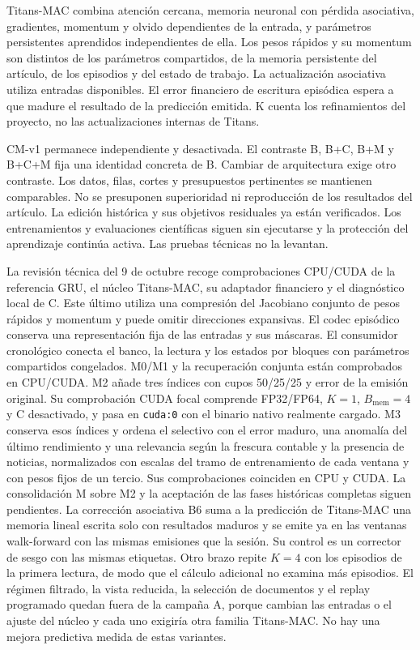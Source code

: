 \documentclass[11pt,a4paper]{report}
\begin{document}
Titans-MAC combina atención cercana, memoria neuronal con pérdida asociativa,
gradientes, momentum y olvido dependientes de la entrada, y parámetros
persistentes aprendidos independientes de ella. Los pesos rápidos y su momentum
son distintos de los parámetros compartidos, de la memoria persistente del
artículo, de los episodios y del estado de trabajo. La actualización asociativa
utiliza entradas disponibles. El error financiero de escritura episódica espera
a que madure el resultado de la predicción emitida. K cuenta los refinamientos
del proyecto, no las actualizaciones internas de Titans.

CM-v1 permanece independiente y desactivada. El contraste B, B+C, B+M y B+C+M
fija una identidad concreta de B. Cambiar de arquitectura exige otro contraste.
Los datos, filas, cortes y presupuestos pertinentes se mantienen comparables.
No se presuponen superioridad ni reproducción de los resultados del artículo.
La edición histórica y sus objetivos residuales ya están verificados. Los
entrenamientos y evaluaciones científicas siguen sin ejecutarse y la protección
del aprendizaje continúa activa. Las pruebas técnicas no la levantan.

La revisión técnica del 9 de octubre recoge comprobaciones CPU/CUDA de la referencia GRU,
el núcleo Titans-MAC, su adaptador financiero y el diagnóstico local de C.
Este último utiliza una compresión del Jacobiano conjunto de pesos rápidos
y momentum y puede omitir direcciones expansivas. El codec episódico conserva
una representación fija de las entradas y sus máscaras. El consumidor
cronológico conecta el banco, la lectura y los estados por bloques con
parámetros compartidos congelados. M0/M1 y la recuperación conjunta están
comprobados en CPU/CUDA. M2 añade tres índices con cupos 50/25/25 y error de la
emisión original. Su comprobación CUDA focal comprende FP32/FP64, $K=1$,
$B_{\mathrm{mem}}=4$ y C desactivado, y pasa en \texttt{cuda:0} con el binario
nativo realmente cargado. M3 conserva esos índices y ordena el selectivo con
el error maduro, una anomalía del último rendimiento y una relevancia según la
frescura contable y la presencia de noticias, normalizados con escalas del
tramo de entrenamiento de cada ventana y con pesos fijos de un tercio. Sus
comprobaciones coinciden en CPU y CUDA. La consolidación M sobre M2 y la
aceptación de las fases históricas completas siguen pendientes. La corrección
asociativa B6 suma a la predicción de Titans-MAC una memoria lineal escrita
solo con resultados maduros y se emite ya en las ventanas walk-forward con las
mismas emisiones que la sesión. Su control es un corrector de sesgo con las
mismas etiquetas. Otro brazo repite $K=4$ con los episodios de la primera
lectura, de modo que el cálculo adicional no examina más episodios. El régimen
filtrado, la vista reducida, la selección de documentos y el replay programado
quedan fuera de la campaña A, porque cambian las entradas o el ajuste del
núcleo y cada uno exigiría otra familia Titans-MAC. No hay una mejora
predictiva medida de estas variantes.
\end{document}
